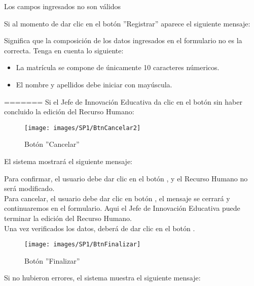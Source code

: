                 \item Los campos ingresados no son válidos

                    Si al momento de dar clic en el botón ''Registrar'' aparece el siguiente mensaje:

                    Significa que la composición de los datos ingresados en el formulario no es la correcta. Tenga en cuenta lo siguiente:

                    \begin{itemize}
                        \item La matrícula se compone de únicamente 10 caracteres númericos.
                        \item El nombre y apellidos debe iniciar con mayúscula.
                    \end{itemize}

=======
        Si el Jefe de Innovación Educativa da clic en el botón  sin haber concluido la edición del Recurso Humano:
        
        \begin{figure}[!hbtp]
        	\centering
        	\hypertarget{cancel2}{\texttt{[image: images/SP1/BtnCancelar2]}}
        	\caption{Botón ''Cancelar''}
        	\label{cancel2}
        \end{figure}
        
        El sistema mostrará el siguiente mensaje:
        
        Para confirmar, el usuario debe dar clic en el botón , y el Recurso Humano no será modificado.\\
        
        Para cancelar, el usuario debe dar clic en botón , el mensaje se cerrará y continuaremos en el formulario. Aqui el Jefe de Innovación Educativa puede terminar la edición del Recurso Humano.\\

        Una vez verificados los datos, deberá de dar clic en el botón .
        \begin{figure}[!hbtp]
        	\centering
        	\hypertarget{btnfin}{\texttt{[image: images/SP1/BtnFinalizar]}}
        	\caption{Botón ''Finalizar''}
        	\label{btnfin}
        \end{figure}
        
        Si no hubieron errores, el sistema muestra el siguiente mensaje:
        
